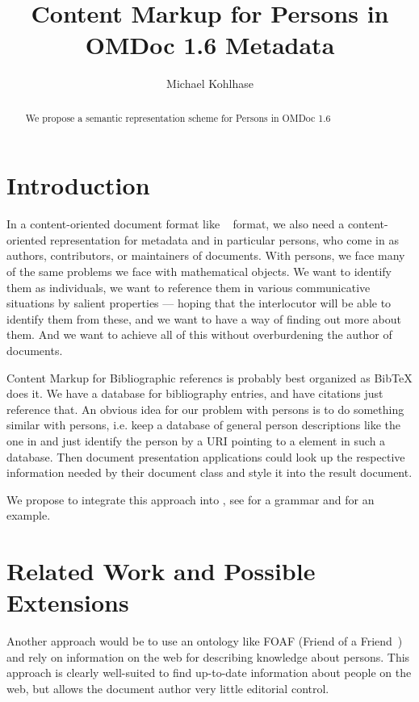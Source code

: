\documentclass[12pt]{article}
\title{Content Markup for Persons in OMDoc 1.6 Metadata}
\author{Michael Kohlhase}
\begin{document}
\maketitle
\begin{abstract}
  We propose a semantic representation scheme for Persons in OMDoc 1.6
\end{abstract}

\section{Introduction}

In a content-oriented document format like {\omdoc}~\cite{Kohlhase:omdoc1.2} format, we
also need a content-oriented representation for metadata and in particular persons, who
come in as authors, contributors, or maintainers of documents. With persons, we face many
of the same problems we face with mathematical objects. We want to identify them as
individuals, we want to reference them in various communicative situations by salient
properties --- hoping that the interlocutor will be able to identify them from these, and
we want to have a way of finding out more about them. And we want to achieve all of this
without overburdening the author of documents. 

Content Markup for Bibliographic referencs is probably best organized as
BibTeX does it. We have a database for bibliography entries, and have
citations just reference that. An obvious idea for our problem with persons is to do
something similar with persons, i.e. keep a database of general person descriptions like
the one in {} and just identify the person by a URI pointing to a
{} element in such a database. Then document presentation applications
could look up the respective information needed by their document class and style it into
the result document. 

We propose to integrate this approach into {}, see {} for a
grammar and {} for an example.

\section{Related Work and Possible Extensions}\label{sec:relwork}

Another approach would be to use an ontology like FOAF (Friend of a
Friend~\cite{FOAF:webpage}) and rely on information on the web for describing knowledge
about persons. This approach is clearly well-suited to find up-to-date information about
people on the web, but allows the document author very little editorial control.
\end{document}
